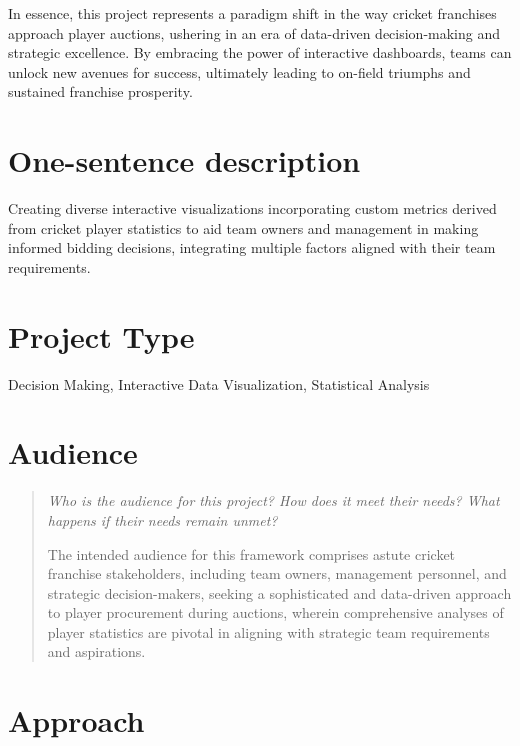 \documentclass{proc}
\begin{document}
In essence, this project represents a paradigm shift in the way cricket franchises approach player auctions, ushering in an era of data-driven decision-making and strategic excellence. By embracing the power of interactive dashboards, teams can unlock new avenues for success, ultimately leading to on-field triumphs and sustained franchise prosperity.

\section{One-sentence description}
Creating diverse interactive visualizations incorporating custom metrics derived from cricket player statistics to aid team owners and management in making informed bidding decisions, integrating multiple factors aligned with their team requirements.

\section{Project Type}
Decision Making, Interactive Data Visualization, Statistical Analysis

\section{Audience}
\begin{quote}
\textit{Who is the audience for this project? 
How does it meet their needs? 
What happens if their needs remain unmet?}

The intended audience for this framework comprises astute cricket franchise stakeholders, including team owners, management personnel, and strategic decision-makers, seeking a sophisticated and data-driven approach to player procurement during auctions, wherein comprehensive analyses of player statistics are pivotal in aligning with strategic team requirements and aspirations.

\end{quote}

\section{Approach}
\end{document}
